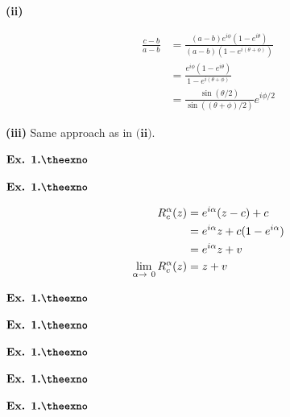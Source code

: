 \documentclass{article}
\def\tf{\textbf}
\def\rto{\ensuremath\rightarrow\ }
\newcounter{exno}
\begin{document}
\tf{(ii)} 

\begin{align*}
    \frac{c-b}{a-b} &= \frac{(a-b)e^{i\phi}(1-e^{i\theta})}{(a-b)(1-e^{i(\theta+\phi)})}\\
    &= \frac{e^{i\phi}(1-e^{i\theta})}{1-e^{i(\theta+\phi)}}\\
    &= \frac{\sin(\theta/2)}{\sin((\theta+\phi)/2)}e^{i\phi/2}
\end{align*}

\tf{(iii)} Same approach as in $\tf{(ii)}$.

\vspace{0.2in}

${\textbf{Ex. 1.\theexno}}$
\addtocounter{exno}{1}

\vspace{0.2in}

${\textbf{Ex. 1.\theexno}}$
\addtocounter{exno}{1}

\begin{align*}
    R_{c}^{\alpha}(z) &= e^{i\alpha}(z-c)+c\\
    &= e^{i\alpha}z +c(1-e^{i\alpha})\\
    &= e^{i\alpha}z + v\\
    \lim_{\alpha\rto 0} R_{c}^{\alpha}(z) &= z+v
\end{align*}

\vspace{0.2in}

${\textbf{Ex. 1.\theexno}}$
\addtocounter{exno}{1}



\vspace{0.2in}

${\textbf{Ex. 1.\theexno}}$
\addtocounter{exno}{1}

\vspace{0.2in}

${\textbf{Ex. 1.\theexno}}$
\addtocounter{exno}{1}

\vspace{0.2in}

${\textbf{Ex. 1.\theexno}}$
\addtocounter{exno}{1}

\vspace{0.2in}

${\textbf{Ex. 1.\theexno}}$
\addtocounter{exno}{1}
\end{document}
